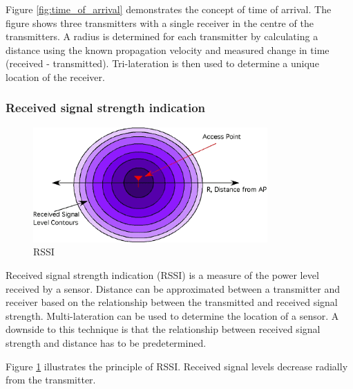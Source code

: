 \documentclass[11pt,a4paper]{report}
\begin{document}
			Figure \ref{fig:time_of_arrival} demonstrates the concept of time of arrival. The figure shows three transmitters with a single receiver in the centre of the transmitters. A radius is determined for each transmitter by calculating a distance using the known propagation velocity and measured change in time (received - transmitted). Tri-lateration is then used to determine a unique location of the receiver.
		
		\subsubsection{Received signal strength indication}
			\begin{figure}[H]
				\centering
				\includegraphics[width=0.8\textwidth]{rssi}
				\caption{RSSI}
				\label{fig:rssi}
			\end{figure}
			Received signal strength indication (RSSI) is a measure of the power level received by a sensor. Distance can be approximated between a transmitter and receiver based on the relationship between the transmitted and received signal strength. Multi-lateration can be used to determine the location of a sensor.
			A downside to this technique is that the relationship between received signal strength and distance has to be predetermined.
			
			Figure \ref{fig:rssi} illustrates the principle of RSSI. Received signal levels decrease radially from the transmitter.
		
\end{document}
